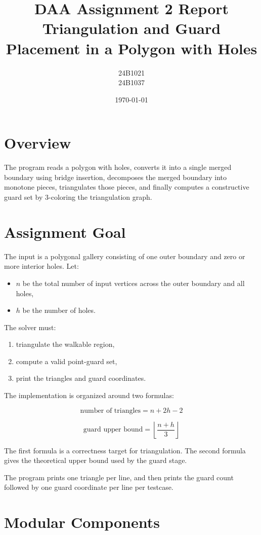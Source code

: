 \documentclass[11pt]{article}
\title{DAA Assignment 2 Report\\Triangulation and Guard Placement in a Polygon with Holes}
\author{24B1021\\24B1037}
\date{\today}
\begin{document}
\maketitle

\section*{Overview}

The program reads a polygon with holes, converts it into a single merged boundary using bridge insertion, decomposes the merged boundary into monotone pieces, triangulates those pieces, and finally computes a constructive guard set by 3-coloring the triangulation graph.

\section{Assignment Goal}

The input is a polygonal gallery consisting of one outer boundary and zero or more interior holes. Let:

\begin{itemize}
\item $n$ be the total number of input vertices across the outer boundary and all holes,
\item $h$ be the number of holes.
\end{itemize}

The solver must:

\begin{enumerate}
\item triangulate the walkable region,
\item compute a valid point-guard set,
\item print the triangles and guard coordinates.
\end{enumerate}

The implementation is organized around two formulas:

\[
\text{number of triangles} = n + 2h - 2
\]

\[
\text{guard upper bound} = \left\lfloor \frac{n+h}{3} \right\rfloor
\]

The first formula is a correctness target for triangulation. The second formula gives the theoretical upper bound used by the guard stage.

The program prints one triangle per line, and then prints the guard count followed by one guard coordinate per line per testcase.

\section{Modular Components}
\end{document}
